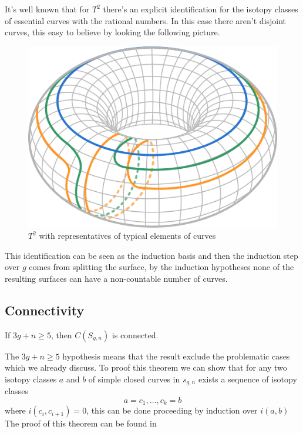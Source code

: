 It's well known that for $T^{2}$ there's an explicit identification for the isotopy classes of essential curves with the rational numbers. In this case there aren't disjoint curves, this easy to believe by looking the following picture.
\vspace{1cm}
\begin{figure}[h!]
	\centering
	\includegraphics[scale=0.7]{Figures/Torus.png}
	\caption{$T^{2}$ with representatives of typical elements of curves}
\end{figure}

This identification can be seen as the induction basis and then the induction step over $g$ comes from splitting the surface, by the induction hypotheses none of the resulting surfaces can have a non-countable number of curves.

\subsection{Connectivity}
\begin{theorem}
If $3g+n\geq 5$, then $C(S_{g,n})$ is connected.
\end{theorem}

The $3g+n\geq 5$ hypothesis means that the result exclude the problematic cases which we already discuss. To proof this theorem we can show that for any two isotopy classes $a$ and $b$ of simple closed curves in $s_{g,n}$ exists a sequence of isotopy classes
$$a=c_{1},\dots,c_{k}=b$$
where $i(c_{i},c_{i+1})=0$, this can be done proceeding by induction over $i(a,b)$ The proof of this theorem can be found in \cite[Farb p.~93]{Farb} 

